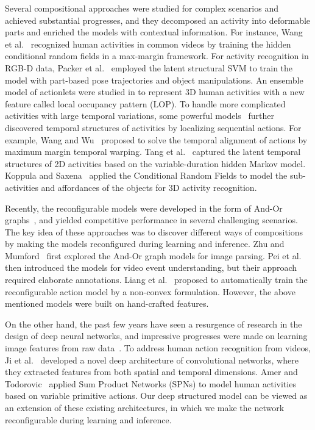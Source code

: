 \documentclass{sig-alternate}
\begin{document}
Several compositional approaches were studied for complex scenarios and achieved substantial progresses\cite{WangPAMI2011,AlanCVPR2013,MMPose2013,CVPR12PoseObject,JCorsoCVPR2012,WuYingCVPR2012,shuichengMM2011,PRLEvent}, and they decomposed an activity into deformable parts and enriched the models with contextual information. For instance, Wang et al.~\cite{WangPAMI2011} recognized human activities in common videos by training the hidden conditional random fields in a max-margin framework. For activity recognition in RGB-D data, Packer et al.~\cite{CVPR12PoseObject} employed the latent structural SVM to train the model with part-based pose trajectories and object manipulations. An ensemble model of actionlets were studied in \cite{WuYingCVPR2012} to represent 3D human activities with a new feature called local occupancy pattern (LOP).  To handle more complicated activities with large temporal variations, some powerful models~\cite{FeifeiCVPR2012,WuYingICCV2013,SinisaICCV2011} further discovered temporal structures of activities by localizing sequential actions. For example, Wang and Wu~\cite{WuYingICCV2013} proposed to solve the temporal alignment of actions by maximum margin temporal warping. Tang et al.~\cite{FeifeiCVPR2012} captured the latent temporal structures of 2D activities based on the variable-duration hidden Markov model. Koppula and Saxena~\cite{SaxenaICML2013} applied the Conditional Random Fields to model the sub-activities and affordances of the objects for 3D activity recognition.

Recently, the reconfigurable models were developed in the form of And-Or graphs~\cite{AOGZhu2006,AOGICCV2011,LiangMM2013,JVTPMM14,AOGCVPR2013}, and yielded competitive performance in several challenging scenarios. The key idea of these approaches was to discover different ways of compositions by making the models reconfigured during learning and inference. Zhu and Mumford~\cite{AOGZhu2006} first explored the And-Or graph models for image parsing. Pei et al.~\cite{AOGICCV2011} then introduced the models for video event understanding, but their approach required elaborate annotations. Liang et al.~\cite{LiangMM2013} proposed to automatically train the reconfigurable action model by a non-convex formulation. However, the above mentioned models were built on hand-crafted features.

On the other hand, the past few years have seen a resurgence of research in the design of deep neural networks, and impressive progresses were made on learning image features from raw data~\cite{Hinton06,LeCunECCV2010,AndrewNgCVPR2011, ImagenetNIPS2012, DSPACV13, rbgCVPR2014}. To address human action recognition from videos, Ji et al.~\cite{3DCNNPAMI} developed a novel deep architecture of convolutional networks, where they extracted features from both spatial and temporal dimensions. Amer and Todorovic~\cite{SinisaSPNCVPR2012} applied Sum Product Networks (SPNs) to model human activities based on variable primitive actions. Our deep structured model can be viewed as an extension of these existing architectures, in which we make the network reconfigurable during learning and inference.
\end{document}
